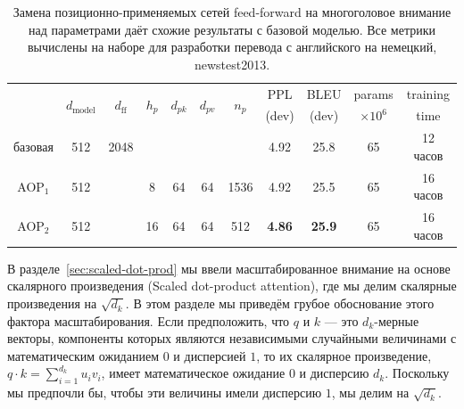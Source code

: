 \documentclass{article}
\newcommand{\dmodel}{d_{\text{model}}}
\newcommand{\dff}{d_{\text{ff}}}
\begin{document}
\begin{table}[h]
\caption{Замена позиционно-применяемых сетей feed-forward на многоголовое внимание над параметрами даёт схожие результаты с базовой моделью. Все метрики вычислены на наборе для разработки перевода с английского на немецкий, newstest2013.}
\label{tab:parameter_attention}
\begin{center}
\vspace{-2mm}
\begin{tabular}{c|cccccc|cccc}
\hline\rule{0pt}{2.0ex}
 & \multirow{2}{*}{$\dmodel$} & \multirow{2}{*}{$\dff$} &
\multirow{2}{*}{$h_p$} & \multirow{2}{*}{$d_{pk}$} & \multirow{2}{*}{$d_{pv}$} &
 \multirow{2}{*}{$n_p$} &
 PPL & BLEU & params & training\\
 & & & & & &  & (dev) & (dev) & $\times10^6$ & time \\
\hline\rule{0pt}{2.0ex}
базовая & 512 & 2048 & & & & & 4.92 & 25.8 & 65 & 12 часов\\
\hline\rule{0pt}{2.0ex}
AOP$_1$ & 512 & & 8 & 64 & 64 & 1536 & 4.92& 25.5  & 65 & 16 часов\\
AOP$_2$ & 512 & & 16 & 64 & 64 & 512 & \textbf{4.86} & \textbf{25.9}  & 65 & 16 часов \\
\hline
\end{tabular}
\end{center}
\end{table}


В разделе~\ref{sec:scaled-dot-prod} мы ввели масштабированное внимание на основе скалярного произведения (Scaled dot-product attention), где мы делим скалярные произведения на $\sqrt{d_k}$. В этом разделе мы приведём грубое обоснование этого фактора масштабирования. Если предположить, что $q$ и $k$ — это $d_k$-мерные векторы, компоненты которых являются независимыми случайными величинами с математическим ожиданием $0$ и дисперсией $1$, то их скалярное произведение, $q \cdot k = \sum_{i=1}^{d_k} u_iv_i$, имеет математическое ожидание $0$ и дисперсию $d_k$. Поскольку мы предпочли бы, чтобы эти величины имели дисперсию $1$, мы делим на $\sqrt{d_k}$.  

\end{document}
